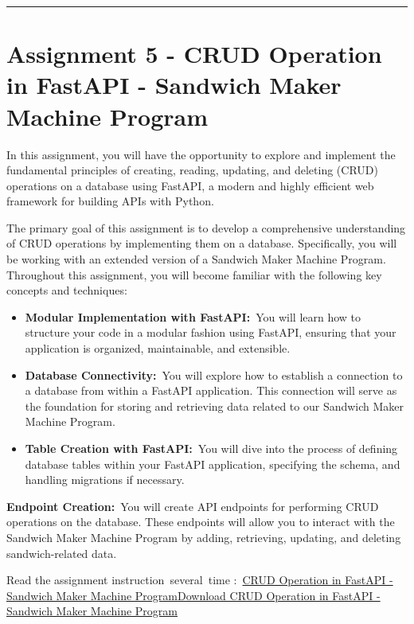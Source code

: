 \documentclass[
]{article}
\providecommand{\tightlist}{%
  \setlength{\itemsep}{0pt}\setlength{\parskip}{0pt}}
\begin{document}
\begin{center}\rule{0.5\linewidth}{0.5pt}\end{center}

\section{Assignment 5 - CRUD Operation in FastAPI - Sandwich Maker
Machine
Program}\label{assignment-5---crud-operation-in-fastapi---sandwich-maker-machine-program}

In this assignment, you will have the opportunity to explore and
implement the fundamental principles of creating, reading, updating, and
deleting (CRUD) operations on a database using FastAPI, a modern and
highly efficient web framework for building APIs with Python.

The primary goal of this assignment is to develop a comprehensive
understanding of CRUD operations by implementing them on a database.
Specifically, you will be working with an extended version of a Sandwich
Maker Machine Program. Throughout this assignment, you will become
familiar with the following key concepts and techniques:

\begin{itemize}
\tightlist
\item
  \textbf{Modular Implementation with FastAPI:}~You will learn how to
  structure your code in a modular fashion using FastAPI, ensuring that
  your application is organized, maintainable, and extensible.
\item
  \textbf{Database Connectivity:}~You will explore how to establish a
  connection to a database from within a FastAPI application. This
  connection will serve as the foundation for storing and retrieving
  data related to our Sandwich Maker Machine Program.
\item
  \textbf{Table Creation with FastAPI:}~You will dive into the process
  of defining database tables within your FastAPI application,
  specifying the schema, and handling migrations if necessary.
\end{itemize}

\textbf{Endpoint Creation:}~You will create API endpoints for performing
CRUD operations on the database. These endpoints will allow you to
interact with the Sandwich Maker Machine Program by adding, retrieving,
updating, and deleting sandwich-related data.

Read the assignment instruction~several~time
:~\href{https://instructure.charlotte.edu/courses/264138/files/33808321?wrap=1}{CRUD
Operation in FastAPI - Sandwich Maker Machine
Program}\href{https://instructure.charlotte.edu/courses/264138/files/33808321/download?download_frd=1}{Download
CRUD Operation in FastAPI - Sandwich Maker Machine Program}
\end{document}
